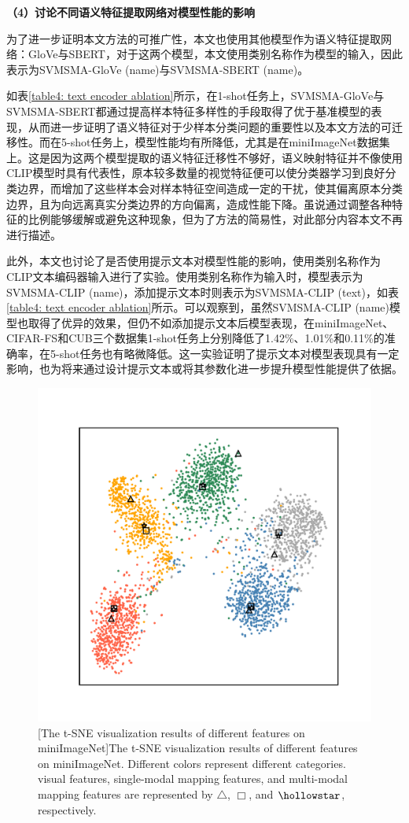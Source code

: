 \textbf{（4）讨论不同语义特征提取网络对模型性能的影响}

为了进一步证明本文方法的可推广性，本文也使用其他模型作为语义特征提取网络：GloVe与SBERT，对于这两个模型，本文使用类别名称作为模型的输入，因此表示为SVMSMA-GloVe (name)与SVMSMA-SBERT (name)。

如表\ref{table4: text encoder ablation}所示，在1-shot任务上，SVMSMA-GloVe与SVMSMA-SBERT都通过提高样本特征多样性的手段取得了优于基准模型的表现，从而进一步证明了语义特征对于少样本分类问题的重要性以及本文方法的可迁移性。而在5-shot任务上，模型性能均有所降低，尤其是在miniImageNet数据集上。这是因为这两个模型提取的语义特征迁移性不够好，语义映射特征并不像使用CLIP模型时具有代表性，原本较多数量的视觉特征便可以使分类器学习到良好分类边界，而增加了这些样本会对样本特征空间造成一定的干扰，使其偏离原本分类边界，且为向远离真实分类边界的方向偏离，造成性能下降。虽说通过调整各种特征的比例能够缓解或避免这种现象，但为了方法的简易性，对此部分内容本文不再进行描述。

此外，本文也讨论了是否使用提示文本对模型性能的影响，使用类别名称作为CLIP文本编码器输入进行了实验。使用类别名称作为输入时，模型表示为SVMSMA-CLIP (name)，添加提示文本时则表示为SVMSMA-CLIP (text)，如表\ref{table4: text encoder ablation}所示。可以观察到，虽然SVMSMA-CLIP (name)模型也取得了优异的效果，但仍不如添加提示文本后模型表现，在miniImageNet、CIFAR-FS和CUB三个数据集1-shot任务上分别降低了1.42\%、1.01\%和0.11\%的准确率，在5-shot任务也有略微降低。这一实验证明了提示文本对模型表现具有一定影响，也为将来通过设计提示文本或将其参数化进一步提升模型性能提供了依据。

\begin{figure}[h!]
  \centering
  \includegraphics[width=0.5\columnwidth]{figures/SVMSMA/miniImageNet/t-SNE.pdf}
  [The t-SNE visualization results of different features on miniImageNet]{The t-SNE visualization results of different features on miniImageNet. Different colors represent different categories. visual features, single-modal mapping features, and multi-modal mapping features are represented by $\triangle$, $\Box$, and $\hollowstar$, respectively.}
  \label{figure4: t-SNE}
\end{figure}

